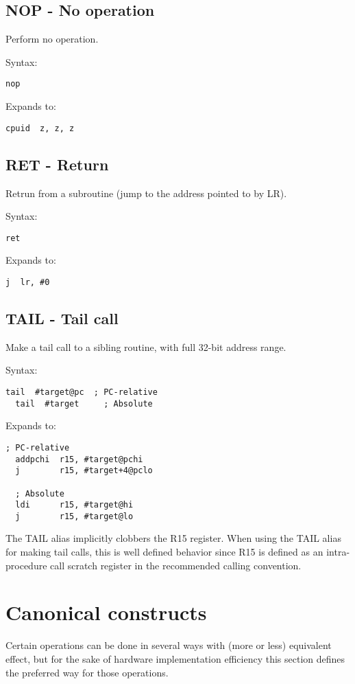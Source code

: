 \subsection{NOP - No operation}

Perform no operation.

Syntax:
\begin{lstlisting}[style=assembler]
  nop
\end{lstlisting}

Expands to:
\begin{lstlisting}[style=assembler]
  cpuid  z, z, z
\end{lstlisting}

\subsection{RET - Return}

Retrun from a subroutine (jump to the address pointed to by LR).

Syntax:
\begin{lstlisting}[style=assembler]
  ret
\end{lstlisting}

Expands to:
\begin{lstlisting}[style=assembler]
  j  lr, #0
\end{lstlisting}

\subsection{TAIL - Tail call}

Make a tail call to a sibling routine, with full 32-bit address range.

Syntax:
\begin{lstlisting}[style=assembler]
  tail  #target@pc  ; PC-relative
  tail  #target     ; Absolute
\end{lstlisting}

Expands to:
\begin{lstlisting}[style=assembler]
  ; PC-relative
  addpchi  r15, #target@pchi
  j        r15, #target+4@pclo

  ; Absolute
  ldi      r15, #target@hi
  j        r15, #target@lo
\end{lstlisting}

\begin{notebox}
The TAIL alias implicitly clobbers the R15 register. When using the TAIL alias
for making tail calls, this is well defined behavior since R15 is defined as an
intra-procedure call scratch register in the recommended calling convention.
\end{notebox}

\section{Canonical constructs}

Certain operations can be done in several ways with (more or less) equivalent
effect, but for the sake of hardware implementation efficiency this section
defines the preferred way for those operations.

\tbd
